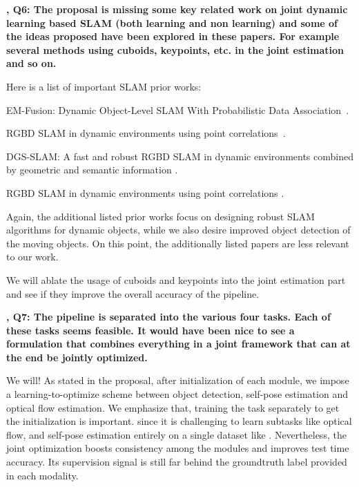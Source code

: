 \documentclass[12pt]{article}
\newcommand{\revThree}{{\color{my_magenta}{R3}}}
\begin{document}
    \textbf{\revThree, Q6: The proposal is missing some key related work on joint dynamic learning based SLAM (both learning and non learning) and some of the ideas proposed have been explored in these papers. For example several methods using cuboids, keypoints, etc. in the joint estimation and so on.
    }

    Here is a list of important SLAM prior works:
    \begin{compactitem}
    \item EM-Fusion: Dynamic Object-Level SLAM With Probabilistic Data Association~\cite{strecke2019fusion}.
    \item RGBD SLAM in dynamic environments using point correlations~\cite{dai2020rgb}.
    \item DGS-SLAM: A fast and robust RGBD SLAM in dynamic environments combined by geometric and semantic information \cite{yan2022dgs}.
    \item RGBD SLAM in dynamic environments using point correlations \cite{dai2020rgb}.
    \end{compactitem}
    Again, the additional listed prior works focus on designing robust SLAM algorithms for dynamic objects, while we also desire improved \threeD object detection of the moving objects.
    On this point, the additionally listed papers are less relevant to our work.

    We will ablate the usage of cuboids and keypoints into the joint estimation part and see if they improve the overall accuracy of the pipeline.

    \textbf{\revThree, Q7: The pipeline is separated into the various four tasks. Each of these tasks seems feasible. It would have been nice to see a formulation that combines everything in a joint framework that can at the end be jointly optimized.}

    We will!
    As stated in the proposal, after initialization of each module, we impose a learning-to-optimize scheme between object detection, self-pose estimation and optical flow estimation. 
    We emphasize that, training the task separately to get the initialization is important.
    since it is challenging to learn subtasks like optical flow, and self-pose estimation entirely on a single dataset like \kitti.
    Nevertheless, the joint optimization boosts consistency among the modules and improves test time accuracy. 
    Its supervision signal is still far behind the groundtruth label provided in each modality.
\end{document}
